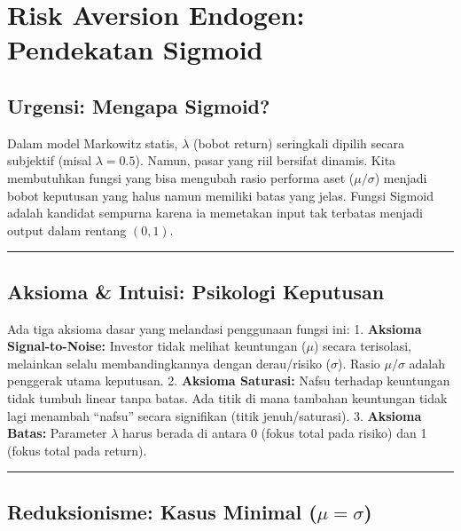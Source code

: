 \section{Risk Aversion Endogen: Pendekatan Sigmoid}\label{appendix-b}

\hypertarget{urgensi-mengapa-sigmoid}{%
\subsection{Urgensi: Mengapa Sigmoid?}\label{urgensi-mengapa-sigmoid}}

Dalam model Markowitz statis, \(\lambda\) (bobot return) seringkali dipilih secara subjektif (misal \(\lambda=0.5\)). Namun, pasar yang riil bersifat dinamis. Kita membutuhkan fungsi yang bisa mengubah rasio performa aset (\(\mu/\sigma\)) menjadi bobot keputusan yang halus namun memiliki batas yang jelas. Fungsi Sigmoid adalah kandidat sempurna karena ia memetakan input tak terbatas menjadi output dalam rentang \((0, 1)\).

\begin{center}\rule{0.5\linewidth}{0.5pt}\end{center}

\hypertarget{aksioma-intuisi-psikologi-keputusan}{%
\subsection{Aksioma \& Intuisi: Psikologi Keputusan}\label{aksioma-intuisi-psikologi-keputusan}}

Ada tiga aksioma dasar yang melandasi penggunaan fungsi ini: 1. \textbf{Aksioma Signal-to-Noise:} Investor tidak melihat keuntungan (\(\mu\)) secara terisolasi, melainkan selalu membandingkannya dengan derau/risiko (\(\sigma\)). Rasio \(\mu/\sigma\) adalah penggerak utama keputusan. 2. \textbf{Aksioma Saturasi:} Nafsu terhadap keuntungan tidak tumbuh linear tanpa batas. Ada titik di mana tambahan keuntungan tidak lagi menambah ``nafsu'' secara signifikan (titik jenuh/saturasi). 3. \textbf{Aksioma Batas:} Parameter \(\lambda\) harus berada di antara 0 (fokus total pada risiko) dan 1 (fokus total pada return).

\begin{center}\rule{0.5\linewidth}{0.5pt}\end{center}

\hypertarget{reduksionisme-kasus-minimal-mu-sigma}{%
\subsection{\texorpdfstring{Reduksionisme: Kasus Minimal (\(\mu = \sigma\))}{Reduksionisme: Kasus Minimal (\textbackslash mu = \textbackslash sigma)}}\label{reduksionisme-kasus-minimal-mu-sigma}}

